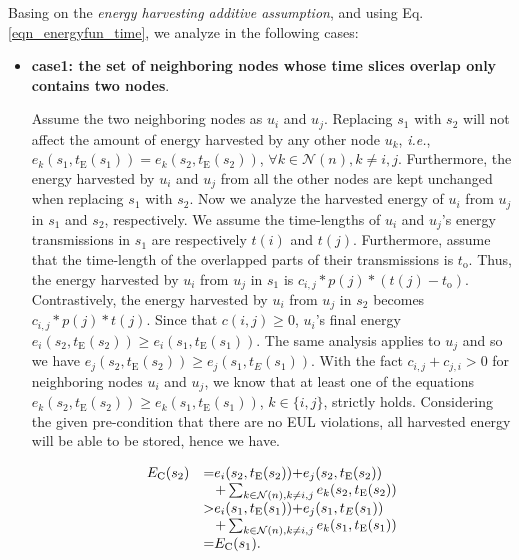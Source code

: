 \documentclass[12pt,journal,onecolumn,draftcls]{IEEEtran}
\begin{document}
\begin{IEEEproof}
Basing on the \textit{energy harvesting additive assumption}, and using Eq.\eqref{eqn_energyfun_time}, we analyze in the following cases:
\begin{itemize}
\item{\textbf{case1: the set of neighboring nodes whose time slices overlap only contains two nodes}}.

Assume the two neighboring nodes as $u_i$ and $u_j$. Replacing $s_1$ with $s_2$ will not affect the amount of energy harvested by any other node $u_k$, \textit{i.e.}, $e_k(s_1,t_\text{E}(s_1)){=}e_k(s_2,t_\text{E}(s_2))$, ${\forall}k{\in}\mathcal{N}(n), k{\neq}i,j$. Furthermore, the energy harvested by $u_i$ and $u_j$ from all the other nodes are kept unchanged when replacing $s_1$ with $s_2$. Now we analyze the harvested energy of $u_i$ from $u_j$ in $s_1$ and $s_2$, respectively. We assume the time-lengths of $u_i$ and $u_j$'s energy transmissions in $s_1$ are respectively $t(i)$ and $t(j)$. Furthermore, assume that the time-length of the overlapped parts of their transmissions is $t_\text{o}$. Thus, the energy harvested by $u_i$ from $u_j$ in $s_1$ is $c_{i,j}{*}p(j){*}(t(j){-}t_\text{o})$. Contrastively, the energy harvested by $u_i$ from $u_j$ in $s_2$ becomes $c_{i,j}{*}p(j){*}t(j)$. Since that $c(i,j){\geq}0$, $u_i$'s final energy $e_i(s_2,t_\text{E}(s_2)){\geq}e_i(s_1,t_\text{E}(s_1))$. The same analysis applies to $u_j$ and so we have $e_j(s_2,t_\text{E}(s_2)){\geq}e_j(s_1,t_E(s_1))$. With the fact $c_{i,j}{+}c_{j,i}{>}0$ for neighboring nodes $u_i$ and $u_j$, we know that at least one of the equations $e_k(s_2,t_\text{E}(s_2)){\geq}e_k(s_1,t_\text{E}(s_1))$, $k{\in}\{i,j\}$, strictly holds. Considering the given pre-condition that there are no EUL violations, all harvested energy will be able to be stored, hence we have.

\begin{equation}
\label{eqn_disjoint_proof}
\begin{array}{rl}
E_\text{C}(s_2)&{=}e_i(s_2,t_\text{E}(s_2)){+}e_j(s_2,t_\text{E}(s_2))\\
&\hspace{3mm}
{+}\mathop{\sum}_{{k{\in}\mathcal{N}(n),k{\neq}i,j}}e_k(s_2,t_\text{E}(s_2))\\
&{>}e_i(s_1,t_\text{E}(s_1)){+}e_j(s_1,t_E(s_1))\\
&\hspace{3mm}
{+}\mathop{\sum}_{{k{\in}\mathcal{N}(n),k{\neq}i,j}}e_k(s_1,t_\text{E}(s_1))\\
&{=}E_\text{C}(s_1).
\end{array}
\end{equation}



\end{itemize}
\end{IEEEproof}
\end{document}
